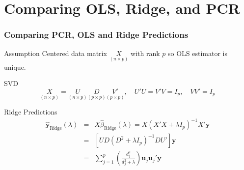 \section{Comparing OLS, Ridge, and PCR}
\begin{frame}
  \frametitle{Comparing PCR, OLS and Ridge Predictions}

  \begin{block}{Assumption}
    Centered data matrix $\underset{(n\times p)}{X}$ with rank $p$ so OLS estimator is unique.
  \end{block}

  \begin{block}{SVD}
    \vspace{-1em}
    \[
      \underset{(n\times p)}{X} = \underset{(n\times p)}{U} \underset{(p\times p)}{D} \underset{(p \times p)}{V'}, \quad U'U = V'V = I_p, \quad VV' = I_p
    \]
  \end{block}

\begin{block}{Ridge Predictions}
  \vspace{-1em}
  \begin{eqnarray*}
    \widehat{\mathbf{y}}_{\text{Ridge}}(\lambda) &=&  X\widehat{\beta}_{\text{Ridge}}(\lambda) = X\left( X'X + \lambda I_p \right)^{-1}X'\mathbf{y} \\
    &=& \left[ UD\left( D^2 + \lambda I_p \right)^{-1}DU' \right]\mathbf{y} \\
  &=& 
  \sum_{j=1}^p   \left( \frac{d_j^2}{d_j^2 + \lambda} \right)\mathbf{u}_j\mathbf{u}_j'\mathbf{y}
  \end{eqnarray*}
\end{block}


\end{frame}
%
%
